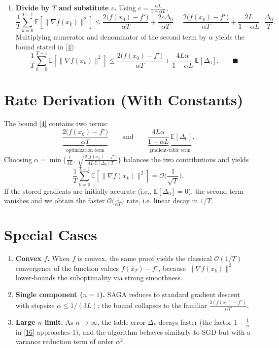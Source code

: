 \documentclass{article}
\newcommand{\E}{\mathbb{E}}
\begin{document}
\begin{enumerate}
\item[Step 13.] \textbf{Divide by $T$ and substitute $c$.}
Using $c=\frac{\alpha L}{1-\alpha L}$,
\[
\frac{1}{T}\sum_{k=0}^{T-1}\E[\|\nabla f(x_k)\|^{2}]
\le \frac{2\big(f(x_0)-f^{\star}\big)}{\alpha T}
+\frac{2c\Delta_0}{\alpha T}
= \frac{2\big(f(x_0)-f^{\star}\big)}{\alpha T}
+\frac{2L}{1-\alpha L}\cdot\frac{\Delta_0}{T}.
\]
Multiplying numerator and denominator of the second term by $\alpha$ yields the bound stated in \eqref{4}:
\[
\frac{1}{T}\sum_{k=0}^{T-1}\E[\|\nabla f(x_k)\|^{2}]
\le
\frac{2\big(f(x_0)-f^{\star}\big)}{\alpha T}
+\frac{4L\alpha}{1-\alpha L}\,\E[\Delta_0].
\qquad\blacksquare
\]

\end{enumerate}

\section*{Rate Derivation (With Constants)}
The bound \eqref{4} contains two terms:
\[
\underbrace{\frac{2\big(f(x_0)-f^{\star}\big)}{\alpha T}}_{\text{optimization term}}
\qquad\text{and}\qquad
\underbrace{\frac{4L\alpha}{1-\alpha L}\,\E[\Delta_0]}_{\text{gradient‑table term}}.
\]
Choosing $\alpha = \min\big\{\frac{1}{3L},\,\sqrt{\frac{2\big(f(x_0)-f^{\star}\big)}{4L\,\E[\Delta_0]\,T}}\big\}$
balances the two contributions and yields
\[
\frac{1}{T}\sum_{k=0}^{T-1}\E[\|\nabla f(x_k)\|^{2}]
= \mathcal{O}\!\Big(\frac{1}{\sqrt{T}}\Big).
\]
If the stored gradients are initially accurate (i.e., $\E[\Delta_0]=0$), the second term vanishes and we obtain the faster $\mathcal{O}\!\big(\frac{1}{\alpha T}\big)$ rate, i.e. linear decay in $1/T$.


\section*{Special Cases}
\begin{enumerate}
\item \textbf{Convex $f$.} When $f$ is convex, the same proof yields the classical $\mathcal{O}(1/T)$ convergence of the function values $f(\bar x_T)-f^{\star}$, because $\|\nabla f(x_k)\|^{2}$ lower‑bounds the suboptimality via strong smoothness.

\item \textbf{Single component ($n=1$).} SAGA reduces to standard gradient descent with stepsize $\alpha\le 1/(3L)$; the bound collapses to the familiar $\frac{2(f(x_0)-f^{\star})}{\alpha T}$.

\item \textbf{Large $n$ limit.} As $n\to\infty$, the table error $\Delta_k$ decays faster (the factor $1-\frac{1}{n}$ in \eqref{16} approaches $1$), and the algorithm behaves similarly to SGD but with a variance reduction term of order $\alpha^{2}$.
\end{enumerate}

\end{document}
